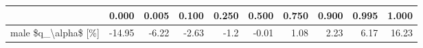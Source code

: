 \begin{tabular}{lrrrrrrrrr}
\toprule
{} &  0.000 &  0.005 &  0.100 &  0.250 &  0.500 &  0.750 &  0.900 &  0.995 &  1.000 \\
\midrule
male \$q\_\textbackslash alpha\$ [\%] & -14.95 &  -6.22 &  -2.63 &   -1.2 &  -0.01 &   1.08 &   2.23 &   6.17 &  16.23 \\
\bottomrule
\end{tabular}
